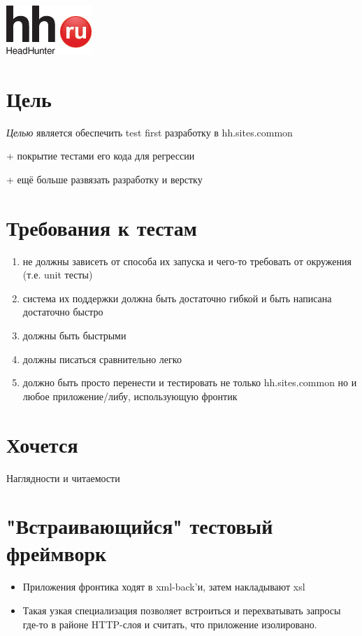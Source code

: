 \documentclass[12pt]{article}
\begin{document}
\TitleSlide
\includegraphics{logo.png}

\section{Цель}
\emph{Целью} является обеспечить test first разработку в hh.sites.common

+ покрытие тестами его кода для регрессии

+ ещё больше развязать разработку и верстку


\section{Требования к тестам}

\begin{enumerate}
\item не должны зависеть от способа их запуска и чего-то требовать от окружения (т.е. unit тесты)
\item система их поддержки должна быть достаточно гибкой и быть написана достаточно быстро
\item должны быть быстрыми
\item должны писаться сравнительно легко
\item должно быть просто перенести и тестировать не только hh.sites.common но и любое приложение/либу, использующую фронтик
\end{enumerate}

\section{Хочется}
Наглядности и читаемости

\section{"Встраивающийся" тестовый фреймворк}

\begin{itemize}
\item Приложения фронтика ходят в xml-back'и, затем накладывают xsl
\item Такая узкая специализация позволяет встроиться и перехватывать запросы где-то в районе HTTP-слоя и считать, что приложение изолировано.
\end{itemize}
\end{document}

